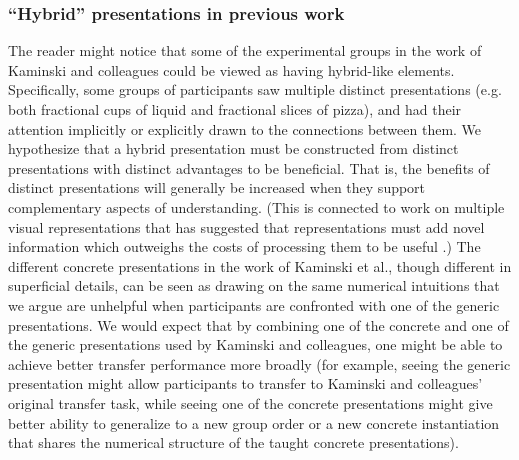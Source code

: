 \documentclass[man,10pt]{apa6}
\begin{document}
\subsubsection{``Hybrid'' presentations in previous work}
The reader might notice that some of the experimental groups in the work of Kaminski and colleagues could be viewed as having hybrid-like elements. Specifically, some groups of participants saw multiple distinct presentations (e.g. both fractional cups of liquid and fractional slices of pizza), and had their attention implicitly or explicitly drawn to the connections between them. We hypothesize that a hybrid presentation must be constructed from distinct presentations with distinct advantages to be beneficial. That is, the benefits of distinct presentations will generally be increased when they support complementary aspects of understanding. (This is connected to work on multiple visual representations that has suggested that representations must add novel information which outweighs the costs of processing them to be useful .) The different concrete presentations in the work of Kaminski et al., though different in superficial details, can be seen as drawing on the same numerical intuitions that we argue are unhelpful when participants are confronted with one of the generic presentations. We would expect that by combining one of the concrete and one of the generic presentations used by Kaminski and colleagues, one might be able to achieve better transfer performance more broadly (for example, seeing the generic presentation might allow participants to transfer to Kaminski and colleagues' original transfer task, while seeing one of the concrete presentations might give better ability to generalize to a new group order or a new concrete instantiation that shares the numerical structure of the taught concrete presentations).  
\end{document}
